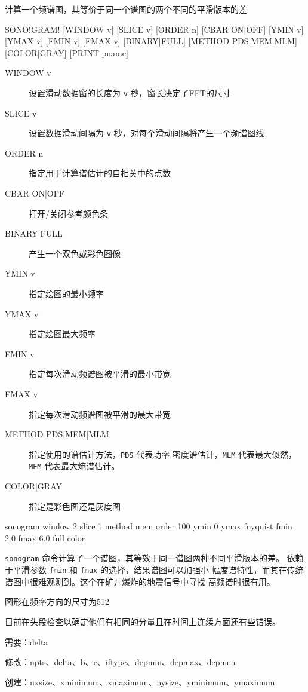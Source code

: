 \label{cmd:sonogram}

计算一个频谱图，其等价于同一个谱图的两个不同的平滑版本的差

\begin{SACSTX}
SONO!GRAM! [WINDOW v] [SLICE v] [ORDER n] [CBAR ON|OFF]
    [YMIN v] [YMAX v] [FMIN v] [FMAX v] [BINARY|FULL]
    [METHOD PDS|MEM|MLM] [COLOR|GRAY] [PRINT pname]
\end{SACSTX}

\begin{description}
\item [WINDOW v] 设置滑动数据窗的长度为 \texttt{v} 秒，窗长决定了FFT的尺寸
\item [SLICE v] 设置数据滑动间隔为 \texttt{v} 秒，对每个滑动间隔将产生一个频谱图线
\item [ORDER n] 指定用于计算谱估计的自相关中的点数
\item [CBAR ON|OFF] 打开/关闭参考颜色条
\item [BINARY|FULL] 产生一个双色或彩色图像
\item [YMIN v] 指定绘图的最小频率
\item [YMAX v] 指定绘图最大频率
\item [FMIN v] 指定每次滑动频谱图被平滑的最小带宽
\item [FMAX v] 指定每次滑动频谱图被平滑的最大带宽
\item [METHOD PDS|MEM|MLM] 指定使用的谱估计方法，\texttt{PDS} 代表功率
    密度谱估计，\texttt{MLM} 代表最大似然，\texttt{MEM} 代表最大熵谱估计。
\item [COLOR|GRAY] 指定是彩色图还是灰度图
\end{description}

\begin{SACDFT}
sonogram window 2 slice 1 method mem order 100 ymin 0 ymax
    fnyquist fmin 2.0 fmax 6.0 full color
\end{SACDFT}

\texttt{sonogram} 命令计算了一个谱图，其等效于同一谱图两种不同平滑版本的差。
依赖于平滑参数 \texttt{fmin} 和 \texttt{fmax} 的选择，结果谱图可以加强小
幅度谱特性，而其在传统谱图中很难观测到。这个在矿井爆炸的地震信号中寻找
高频谱时很有用。

图形在频率方向的尺寸为512

目前在头段检查以确定他们有相同的分量且在时间上连续方面还有些错误。

需要：delta

修改：npts、delta、b、e、iftype、depmin、depmax、depmen

创建：nxsize、xminimum、xmaximum、nysize、yminimum、ymaximum
